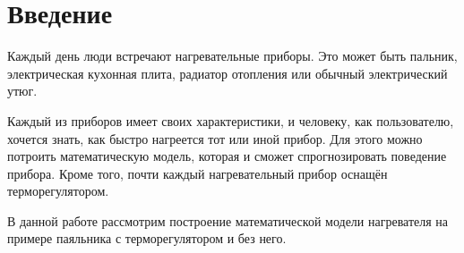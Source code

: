 \section{Введение}

Каждый день люди встречают нагревательные приборы. Это может быть пальник, электрическая кухонная плита, радиатор отопления или обычный электрический утюг.

Каждый из приборов имеет своих характеристики, и человеку, как пользователю, хочется знать, как быстро нагреется тот или иной прибор. Для этого можно потроить математическую модель, которая и сможет спрогнозировать поведение прибора. Кроме того, почти каждый нагревательный прибор оснащён терморегулятором.

В данной работе рассмотрим построение математической модели нагревателя на примере паяльника с терморегулятором и без него.